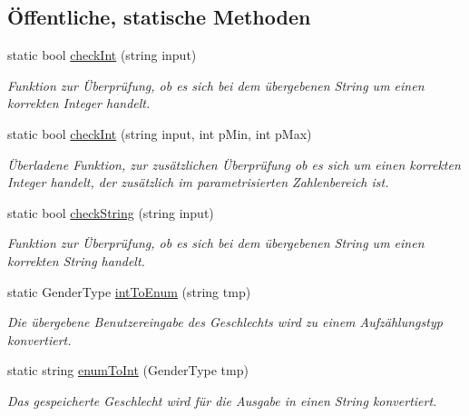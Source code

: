 \subsection*{Öffentliche, statische Methoden}
\begin{DoxyCompactItemize}
\item 
static bool \hyperlink{classContactManager_1_1Controller_a9228c2d2d075707af32f9cceded67566}{check\+Int} (string input)
\begin{DoxyCompactList}\small\item\em Funktion zur Überprüfung, ob es sich bei dem übergebenen String um einen korrekten Integer handelt.\end{DoxyCompactList}\item 
static bool \hyperlink{classContactManager_1_1Controller_a4d7439dbaddaefd7a8ef91d50ce226e9}{check\+Int} (string input, int p\+Min, int p\+Max)
\begin{DoxyCompactList}\small\item\em Überladene Funktion, zur zusätzlichen Überprüfung ob es sich um einen korrekten Integer handelt, der zusätzlich im parametrisierten Zahlenbereich ist.\end{DoxyCompactList}\item 
static bool \hyperlink{classContactManager_1_1Controller_a409958c7f170c9e269e258bb5a4483e2}{check\+String} (string input)
\begin{DoxyCompactList}\small\item\em Funktion zur Überprüfung, ob es sich bei dem übergebenen String um einen korrekten String handelt.\end{DoxyCompactList}\item 
static Gender\+Type \hyperlink{classContactManager_1_1Controller_ac4295728664d4137e39478cd3e30e0fd}{int\+To\+Enum} (string tmp)
\begin{DoxyCompactList}\small\item\em Die übergebene Benutzereingabe des Geschlechts wird zu einem Aufzählungstyp konvertiert.\end{DoxyCompactList}\item 
static string \hyperlink{classContactManager_1_1Controller_a6989880aa8c549f03067cb7d8d1be7a6}{enum\+To\+Int} (Gender\+Type tmp)
\begin{DoxyCompactList}\small\item\em Das gespeicherte Geschlecht wird für die Ausgabe in einen String konvertiert.\end{DoxyCompactList}\end{DoxyCompactItemize}


